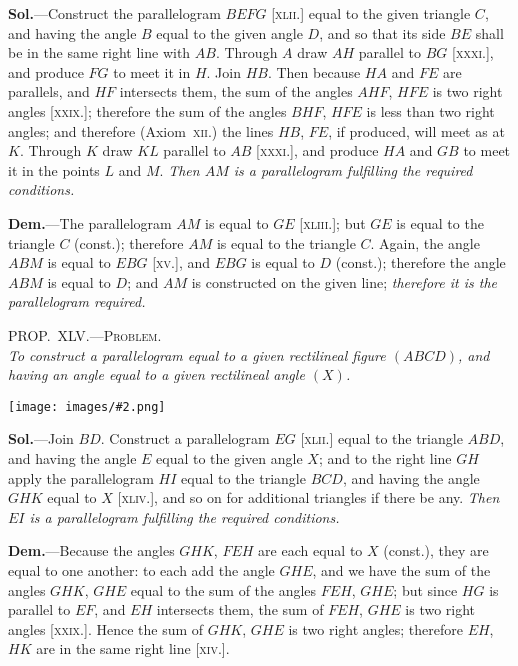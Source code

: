 \documentclass[oneside]{book}
\newcommand\myprop[2]{
\bigskip\Needspace*{4\baselineskip}\begin{center}\textsc{#1}\\\medskip\emph{#2}\par\end{center}
}
\newcommand\imgcent[2]{
\begin{center}
\texttt{[image: images/\#2.png]}
\end{center}
}
\begin{document}
\textbf{Sol.}---Construct the parallelogram $BEFG$ [\textsc{xlii}.] equal
to the given triangle $C$, and having the angle $B$ equal
to the given angle $D$, and so that its side $BE$ shall be in
the same right line with $AB$. Through $A$ draw $AH$
parallel to $BG$ [\textsc{xxxi}.], and produce $FG$ to meet it in $H$.
Join $HB$. Then because $HA$ and $FE$ are parallels, and
$HF$ intersects them, the sum of the angles $AHF$, $HFE$
is two right angles [\textsc{xxix}.]; therefore the sum of the
angles $BHF$, $HFE$ is less than two right angles; and
therefore (Axiom~\textsc{xii}.) the lines $HB$, $FE$, if produced,
will meet as at $K$. Through $K$ draw $KL$ parallel to
$AB$ [\textsc{xxxi}.], and produce $HA$ and $GB$ to meet it in the
points $L$ and $M$. \emph{Then $AM$ is a parallelogram fulfilling
the required conditions.}

\textbf{Dem.}---The parallelogram $AM$ is equal to $GE$
[\textsc{xliii}.]; but $GE$ is equal to the triangle $C$ (const.);
therefore $AM$ is equal to the triangle $C$. Again, the
angle $ABM$ is equal to $EBG$ [\textsc{xv}.], and $EBG$ is equal
to $D$ (const.); therefore the angle $ABM$ is equal to $D$;
and $AM$ is constructed on the given line; \emph{therefore it is
the parallelogram required.}



\myprop{PROP\@.~XLV\@.---Problem.}{To construct a parallelogram equal to a given rectilineal
figure $(ABCD)$, and having an angle equal to a given rectilineal angle $(X)$.}

\imgcent{230}{f067}

\textbf{Sol.}---Join $BD$. Construct a parallelogram $EG$
[\textsc{xlii.}] equal to the triangle $ABD$, and having the
angle $E$ equal to the given angle $X$; and to the right
line $GH$ apply the parallelogram $HI$ equal to the triangle
$BCD$, and having the angle $GHK$ equal to $X$
[\textsc{xliv.}], and so on for additional triangles if there be
any. \textit{Then $EI$ is a parallelogram fulfilling the required
conditions.}

\textbf{Dem.}---Because the angles $GHK$, $FEH$ are each
equal to $X$ (const.), they are equal to one another: to
each add the angle $GHE$, and we have the sum of the
angles $GHK$, $GHE$ equal to the sum of the angles
$FEH$, $GHE$; but since $HG$ is parallel to $EF$, and $EH$
intersects them, the sum of $FEH$, $GHE$ is two right
angles [\textsc{xxix.}]. Hence the sum of $GHK$, $GHE$ is two
right angles; therefore $EH$, $HK$ are in the same right
line [\textsc{xiv.}].
\end{document}

